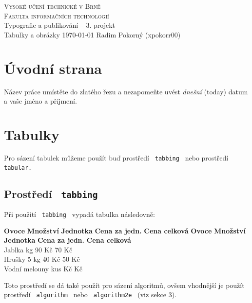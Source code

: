 \documentclass[a4paper,11pt]{article}
\begin{document}
\begin{titlepage}
    \begin{center}
        {\Huge\textsc{Vysoké učení technické v Brně}\\}
        \vspace{0.5em}
        {\huge \textsc{Fakulta informačních technologií}\\}
        \vfill
        \vspace{-5cm}
        {\LARGE Typografie a publikování – 3. projekt\\}
        \vspace{0.6em}
        {\Huge Tabulky a obrázky}
        \vfill
        \Large{\today} \hfill \Large{Radim Pokorný (xpokorr00)}
    \end{center}
\end{titlepage}

\section{Úvodní strana}
    Název práce umístěte do zlatého řezu a nezapomeňte uvést \emph{dnešní} (today) datum a vaše jméno a příjmení.
\section{Tabulky}
    Pro sázení tabulek můžeme použít buď prostředí \texttt{ tabbing } nebo prostředí \texttt{ tabular.}
\subsection{Prostředí \texttt{ tabbing }}
    Při použití \texttt{ tabbing } vypadá tabulka následovně:
    \begin{tabbing}
        
        \textbf{Ovoce} \hspace{1.5cm} \= \textbf{Množství} \hspace{0.25cm} \= \textbf{Jednotka} \hspace{0.25cm} \= \textbf{Cena za jedn.} \hspace{0.25cm} \= \textbf{Cena celková} \kill
        \textbf{Ovoce} \> \textbf{Množství} \> \textbf{Jednotka} \> \textbf{Cena za jedn.} \> \textbf{Cena celková} \\
        Jablka  \> kg 90 Kč 70 Kč \\
        Hrušky 5 \> kg 40 Kč 50 Kč \\
        Vodní melouny  \> kus  Kč  Kč \\
    \end{tabbing}
    Toto prostředí se dá také použít pro sázení algoritmů, ovšem vhodnější je použít prostředí \texttt{ algorithm } nebo \texttt{ algorithm2e } (viz sekce 3).
\end{document}
